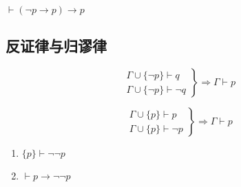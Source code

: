 \documentclass[
    mode=hazy,
    color=blue,
    device=normal,
    lang=cn
]{elegantnote}
\begin{document}
        \begin{proposition}[否定肯定律]
            $\vdash (\lnot p\to p)\to p$
        \end{proposition}
        \subsection{反证律与归谬律}
        \begin{theorem}[反证律]
            $$
            \left.
            \begin{matrix}
                \Gamma\cup\{\lnot p\}\vdash q\\
                \Gamma\cup\{\lnot p\}\vdash\lnot q
            \end{matrix}
            \right\}\Rightarrow \Gamma\vdash p
            $$
        \end{theorem}
        \begin{theorem}[归谬律]
            $$
            \left.
            \begin{matrix}
                \Gamma\cup\{p\}\vdash p\\
                \Gamma\cup\{p\}\vdash\lnot p
            \end{matrix}
            \right\}\Rightarrow \Gamma\vdash p
            $$
        \end{theorem}
        \begin{lemma}[第二双重否定律]
            \begin{enumerate}[label=$\arabic*^\circ$]
                \item $\{p\}\vdash\lnot\lnot p$
                \item $\vdash p\to \lnot\lnot p$
            \end{enumerate}
        \end{lemma}
\end{document}
